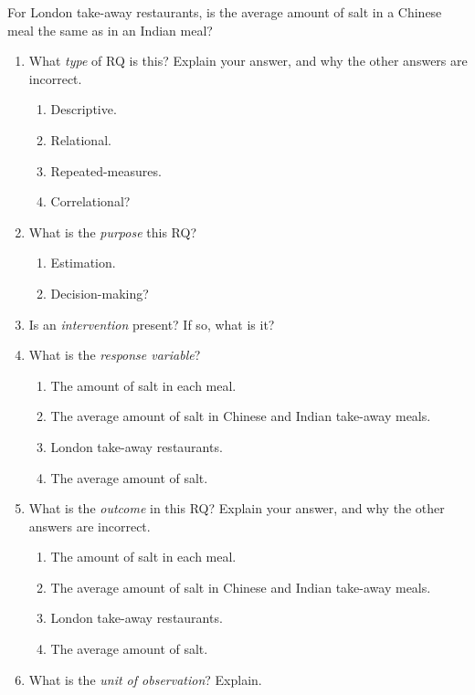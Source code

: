 \documentclass[
  11pt,
  a4paper,
  krantz2]{krantz}
\makeatletter
\providecommand{\tightlist}{%
  \setlength{\itemsep}{0pt}\setlength{\parskip}{0pt}}
\newlength{\greyboxheight}
\newcommand{\setgreyboxheight}[1]{%
  \setlength{\greyboxheight}{2.3\baselineskip * #1}%
}
\newenvironment{greybox}[1]{%
  \nopagebreak
  \setgreyboxheight{#1}%
  \begin{tcolorbox}[
    colframe=gray!30!black,
    boxrule=2pt,
    width=\linewidth,
    height=\greyboxheight,
    valign=center,
    colback=white,
    left=4pt,
    right=4pt, 
    top=4pt, 
    bottom=4pt,
    before skip=4pt,
    after skip=4pt
  ]
\vspace*{\greyboxheight} %
}{%
  \end{tcolorbox}
  \goodbreak
}
\newcommand{\answerbox}[1]{\noindent\begin{greybox}{#1}\end{greybox}}
\renewenvironment{quote}%
{\begin{kframe}}
{\end{kframe}}
\newenvironment{kframe}{%
\medskip{}
\setlength{\fboxsep}{.8em}
 \def\at@end@of@kframe{}%
 \ifinner\ifhmode%
  \def\at@end@of@kframe{\end{minipage}}%
  \begin{minipage}{\columnwidth}%
 \fi\fi%
 \def\FrameCommand##1{\hskip\@totalleftmargin \hskip-\fboxsep
 \colorbox{shadecolor}{##1}\hskip-\fboxsep
     \hskip-\linewidth \hskip-\@totalleftmargin \hskip\columnwidth}%
 \MakeFramed {\advance\hsize-\width
   \@totalleftmargin\z@ \linewidth\hsize
   \@setminipage}}%
 {\par\unskip\endMakeFramed%
 \at@end@of@kframe}
\renewenvironment{quote}
               {\list{}{\vspace{-0.5em}\begin{kframe}\small%
                        \rightmargin   \leftmargin
                        \parsep        \z@ \@plus\p@}%
                \item\relax}
               {\end{kframe}\endlist}
\makeatother
\begin{document}
\begin{quote}
For London take-away restaurants, is the average amount of salt in a Chinese meal the same as in an Indian meal?
\end{quote}

\begin{enumerate}
\def\labelenumi{\arabic{enumi}.}
\item
  What \emph{type} of RQ is this? \tightlist
  Explain your answer, and why the other answers are incorrect.

  \begin{enumerate}
  \def\labelenumii{\alph{enumii}.}
  \tightlist
  \item
    Descriptive.
  \item
    Relational.
  \item
    Repeated-measures.
  \item
    Correlational?
  \end{enumerate}
\item
  What is the \emph{purpose} this RQ? \tightlist

  \begin{enumerate}
  \def\labelenumii{\alph{enumii}.}
  \tightlist
  \item
    Estimation.
  \item
    Decision-making?
  \end{enumerate}
\item
  Is an \emph{intervention} present?
  If so, what is it?
  \answerbox{2}
\item
  What is the \emph{response variable}?

  \begin{enumerate}
  \def\labelenumii{\alph{enumii}.}
  \tightlist
  \item
    The amount of salt in each meal.
  \item
    The average amount of salt in Chinese and Indian take-away meals.
  \item
    London take-away restaurants.
  \item
    The average amount of salt.
  \end{enumerate}
\item
  What is the \emph{outcome} in this RQ?
  Explain your answer, and why the other answers are incorrect.

  \begin{enumerate}
  \def\labelenumii{\alph{enumii}.}
  \tightlist
  \item
    The amount of salt in each meal.
  \item
    The average amount of salt in Chinese and Indian take-away meals.
  \item
    London take-away restaurants.
  \item
    The average amount of salt.
  \end{enumerate}
\item
  What is the \emph{unit of observation}?
  Explain.


\end{enumerate}
\end{document}
